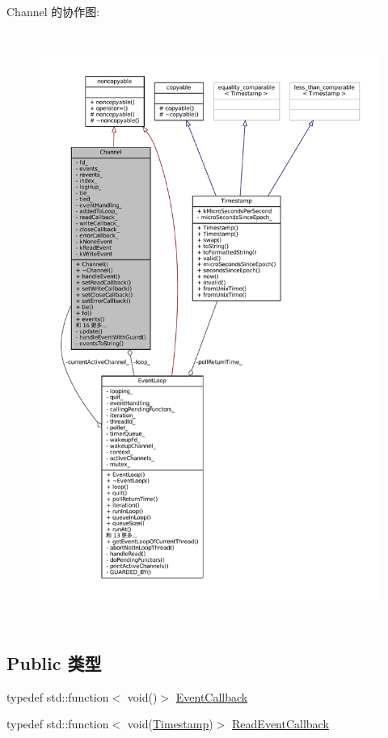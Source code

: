 Channel 的协作图\+:
\nopagebreak
\begin{figure}[H]
\begin{center}
\leavevmode
\includegraphics[height=550pt]{classmuduo_1_1net_1_1Channel__coll__graph}
\end{center}
\end{figure}
\subsection*{Public 类型}
\begin{DoxyCompactItemize}
\item 
typedef std\+::function$<$ void()$>$ \hyperlink{classmuduo_1_1net_1_1Channel_aefcb94d55a02528f90f3aa028191dcb2}{Event\+Callback}
\item 
typedef std\+::function$<$ void(\hyperlink{classmuduo_1_1Timestamp}{Timestamp})$>$ \hyperlink{classmuduo_1_1net_1_1Channel_ae78e1c2582cc5d60cd1a4506851e8991}{Read\+Event\+Callback}
\end{DoxyCompactItemize}
